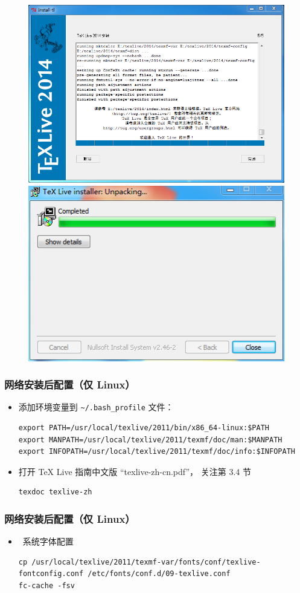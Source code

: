 \documentclass[xcolor=table,dvipsnames,svgnames]{beamer}
\newcommand{\XeTeX}{\hologo{XeTeX}}
\def\TeXLive{\TeX{} Live\xspace}
\begin{document}
\begin{frame}
  \begin{figure}[h]
  \centering
  \includegraphics[width=.5\textwidth]{simple9-installed.png}%
  \hspace{2em}
  \includegraphics[width=.3\textwidth]{simple10-close.png}
  \end{figure}
\end{frame}

\begin{frame}[fragile]
  \frametitle{网络安装后配置（仅 Linux）}
\begin{itemize}
  \item
    添加环境变量到 \nolinkurl{~/.bash_profile} 文件：
    \begin{lstlisting}
export PATH=/usr/local/texlive/2011/bin/x86_64-linux:$PATH
export MANPATH=/usr/local/texlive/2011/texmf/doc/man:$MANPATH
export INFOPATH=/usr/local/texlive/2011/texmf/doc/info:$INFOPATH
    \end{lstlisting}

  \item
打开 \TeXLive 指南中文版 ``texlive-zh-cn.pdf''，
关注第 3.4 节
  \begin{lstlisting}
texdoc texlive-zh
  \end{lstlisting}

\end{itemize}
\end{frame}

\begin{frame}[fragile]
  \frametitle{网络安装后配置（仅 Linux）}
  \begin{itemize}
\item
\XeTeX\ 系统字体配置
\begin{lstlisting}
cp /usr/local/texlive/2011/texmf-var/fonts/conf/texlive-fontconfig.conf /etc/fonts/conf.d/09-texlive.conf
fc-cache -fsv
\end{lstlisting}

\end{itemize}
\end{frame}
\end{document}
